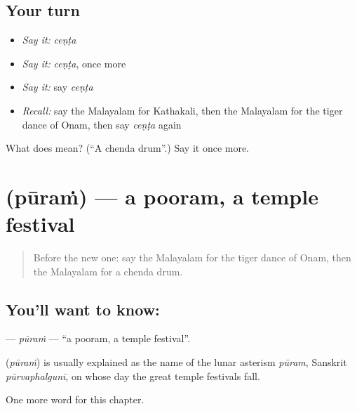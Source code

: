 \subsection*{Your turn}
\begin{itemize}
\raggedright
  \item \emph{Say it:} \emph{ceṇṭa}
  \item \emph{Say it:} \emph{ceṇṭa}, once more
  \item \emph{Say it:} say \emph{ceṇṭa}
  \item \emph{Recall:} say the Malayalam for Kathakali, then the Malayalam for the tiger dance of Onam, then say \emph{ceṇṭa} again
\end{itemize}

\begin{tcolorbox}[breakable,colback=teal!4,colframe=teal!35!black,title={Before you move on}]
What does  mean? (\textquotedblleft{}A chenda drum\textquotedblright{}.) Say it once more.
\end{tcolorbox}
\section[\texorpdfstring{\ml{പൂരം} (pūraṁ)}{പൂരം (pūraṁ)}]{ (pūraṁ) — a pooram, a temple festival}

\label{lesson:ML-C290-puram}



\begin{quote}
Before the new one: say the Malayalam for the tiger dance of Onam, then the Malayalam for a chenda drum.
\end{quote}

\subsection*{You'll want to know: }
\textbf{} — \emph{pūraṁ} — \textquotedblleft{}a pooram, a temple festival\textquotedblright{}.

\begin{cousinweb}
\textbf{} (\emph{pūraṁ}) is usually explained as the name of the lunar asterism \emph{pūram}, Sanskrit \emph{pūrvaphalgunī}, on whose day the great temple festivals fall.
\end{cousinweb}

\begin{grammarlens}[title={What you've built}]
One more word for this chapter.
\end{grammarlens}

